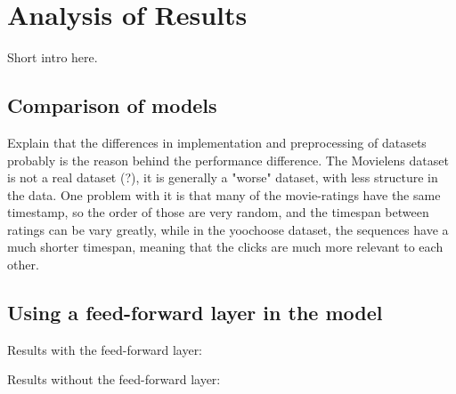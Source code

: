 \chapter{Analysis of Results}
Short intro here.

\section{Comparison of models}
Explain that the differences in implementation and preprocessing of datasets probably is the reason behind the performance difference. 
The Movielens dataset is not a real dataset (?), it is generally a "worse" dataset, with less structure in the data. One problem with it is that many of the movie-ratings have the same timestamp, so the order of those are very random, and the timespan between ratings can be vary greatly, while in the yoochoose dataset, the sequences have a much shorter timespan, meaning that the clicks are much more relevant to each other.

\section{Using a feed-forward layer in the model}

Results with the feed-forward layer:


Results without the feed-forward layer:



